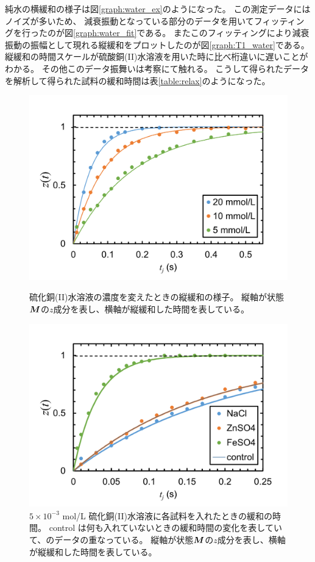 \documentclass[11pt,dvipdfmx,a4paper]{jsarticle}
\begin{document}
純水の横緩和の様子は図\ref{graph:water_ex}のようになった。
この測定データにはノイズが多いため、
減衰振動となっている部分のデータを用いてフィッティングを行ったのが図\ref{graph:water_fit}である。
またこのフィッティングにより減衰振動の振幅として現れる縦緩和をプロットしたのが図\ref{graph:T1_water}である。
縦緩和の時間スケールが硫酸銅(II)水溶液を用いた時に比べ桁違いに遅いことがわかる。
その他このデータ振舞いは考察にて触れる。
こうして得られたデータを解析して得られた試料の緩和時間は表\ref{table:relax}のようになった。
\begin{figure}[H]
	\centering
	\begin{minipage}[t]{0.48\columnwidth}
		\centering
		\includegraphics[width=\columnwidth]{graph/T1_con.png}
		\caption{硫化銅(II)水溶液の濃度を変えたときの縦緩和の様子。
		縦軸が状態\(\vb*{M}\)の\(z\)成分を表し、横軸が縦緩和した時間を表している。}
		\label{graph:T1_con}
	\end{minipage}
	\hfill
	\begin{minipage}[t]{0.48\columnwidth}
		\centering
		\includegraphics[width=\columnwidth]{graph/T1_var.png}
		\caption{\(5\times 10^{-3}\) mol/L 硫化銅(II)水溶液に各試料を入れたときの緩和の時間。
		control は何も入れていないときの緩和時間の変化を表していて、のデータの重なっている。
		縦軸が状態\(\vb*{M}\)の\(z\)成分を表し、横軸が縦緩和した時間を表している。}
		\label{graph:T1_var}
	\end{minipage}
\end{figure}
\end{document}
